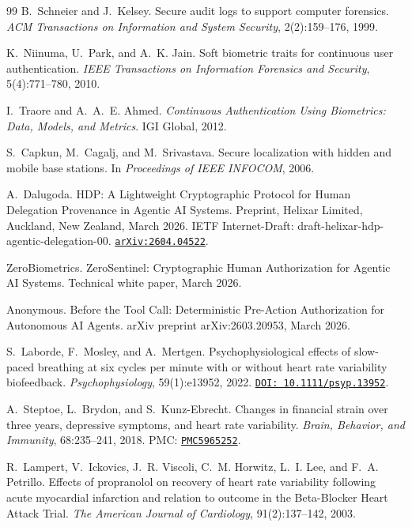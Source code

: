 \documentclass[12pt,a4paper]{article}
\begin{document}
\begin{thebibliography}{99}
B.~Schneier and J.~Kelsey.
Secure audit logs to support computer forensics.
\textit{ACM Transactions on Information and System Security},
2(2):159--176, 1999.

K.~Niinuma, U.~Park, and A.~K. Jain.
Soft biometric traits for continuous user authentication.
\textit{IEEE Transactions on Information Forensics and Security},
5(4):771--780, 2010.

I.~Traore and A.~A.~E. Ahmed.
\textit{Continuous Authentication Using Biometrics: Data, Models, and Metrics}.
IGI Global, 2012.

S.~Capkun, M.~Cagalj, and M.~Srivastava.
Secure localization with hidden and mobile base stations.
In \textit{Proceedings of IEEE INFOCOM}, 2006.

A.~Dalugoda.
HDP: A Lightweight Cryptographic Protocol for Human Delegation Provenance
in Agentic AI Systems.
Preprint, Helixar Limited, Auckland, New Zealand, March 2026.
IETF Internet-Draft: draft-helixar-hdp-agentic-delegation-00.
\href{https://arxiv.org/abs/2604.04522}{\texttt{arXiv:2604.04522}}.

ZeroBiometrics.
ZeroSentinel: Cryptographic Human Authorization for Agentic AI Systems.
Technical white paper, March 2026.

Anonymous.
Before the Tool Call: Deterministic Pre-Action Authorization for Autonomous
AI Agents.
arXiv preprint arXiv:2603.20953, March 2026.

S.~Laborde, F.~Mosley, and A.~Mertgen.
Psychophysiological effects of slow-paced breathing at six cycles per minute
with or without heart rate variability biofeedback.
\textit{Psychophysiology}, 59(1):e13952, 2022.
\href{https://doi.org/10.1111/psyp.13952}{\texttt{DOI:~10.1111/psyp.13952}}.

A.~Steptoe, L.~Brydon, and S.~Kunz-Ebrecht.
Changes in financial strain over three years, depressive symptoms, and heart
rate variability.
\textit{Brain, Behavior, and Immunity}, 68:235--241, 2018.
PMC: \href{https://pmc.ncbi.nlm.nih.gov/articles/PMC5965252/}{\texttt{PMC5965252}}.

R.~Lampert, V.~Ickovics, J.~R. Viscoli, C.~M. Horwitz, L.~I. Lee,
and F.~A. Petrillo.
Effects of propranolol on recovery of heart rate variability following acute
myocardial infarction and relation to outcome in the Beta-Blocker Heart
Attack Trial.
\textit{The American Journal of Cardiology}, 91(2):137--142, 2003.


\end{thebibliography}
\end{document}
